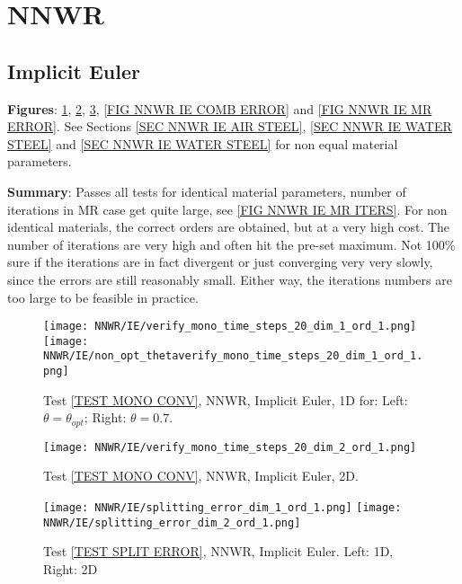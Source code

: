 \documentclass[a4paper,10pt]{article}
\begin{document}
\FloatBarrier
%
\section{NNWR}\label{SEC NNWR}
%
%
\subsection{Implicit Euler}\label{SEC DWNR IE}
% 
\textbf{Figures}: \ref{FIG NNWR IE 1D MONO CONV}, \ref{FIG NNWR IE 2D MONO CONV}, \ref{FIG NNWR IE SPLIT ERROR}, \ref{FIG NNWR IE COMB ERROR} and \ref{FIG NNWR IE MR ERROR}. See Sections \ref{SEC NNWR IE AIR STEEL}, \ref{SEC NNWR IE WATER STEEL} and \ref{SEC NNWR IE WATER STEEL} for non equal material parameters.

\textbf{Summary}: Passes all tests for identical material parameters, number of iterations in MR case get quite large, see \ref{FIG NNWR IE MR ITERS}. For non identical materials, the correct orders are obtained, but at a very high cost. The number of iterations are very high and often hit the pre-set maximum. Not 100\% sure if the iterations are in fact divergent or just converging very very slowly, since the errors are still reasonably small. Either way, the iterations numbers are too large to be feasible in practice.

% 
\begin{figure}[!ht]
\texttt{[image: NNWR/IE/verify\_mono\_time\_steps\_20\_dim\_1\_ord\_1.png]}
\texttt{[image: NNWR/IE/non\_opt\_thetaverify\_mono\_time\_steps\_20\_dim\_1\_ord\_1.png]}
\caption{Test \ref{TEST MONO CONV}, NNWR, Implicit Euler, 1D for: Left: $\theta = \theta_{opt}$; Right: $\theta = 0.7$.}
\label{FIG NNWR IE 1D MONO CONV}
\end{figure}

\begin{figure}[!ht]
\texttt{[image: NNWR/IE/verify\_mono\_time\_steps\_20\_dim\_2\_ord\_1.png]}
\caption{Test \ref{TEST MONO CONV}, NNWR, Implicit Euler, 2D.}
\label{FIG NNWR IE 2D MONO CONV}
\end{figure}

\begin{figure}[!ht]
\texttt{[image: NNWR/IE/splitting\_error\_dim\_1\_ord\_1.png]}
\texttt{[image: NNWR/IE/splitting\_error\_dim\_2\_ord\_1.png]}
\caption{Test \ref{TEST SPLIT ERROR}, NNWR, Implicit Euler. Left: 1D, Right: 2D}
\label{FIG NNWR IE SPLIT ERROR}
\end{figure}
\end{document}
